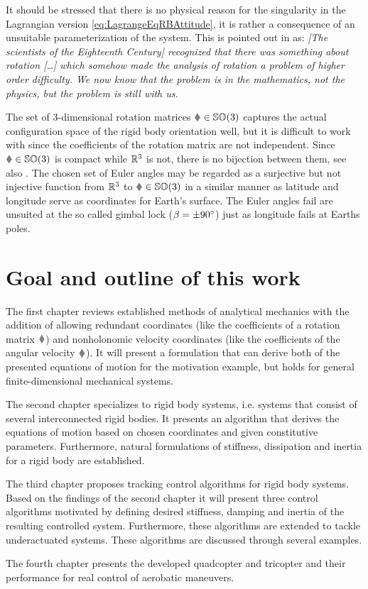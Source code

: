 It should be stressed that there is no physical reason for the singularity in the Lagrangian version \eqref{eq:LagrangeEqRBAttitude}, it is rather a consequence of an unsuitable parameterization of the system.
This is pointed out in \cite[sec.\ 1.1.1]{Schwertassek:MultibodySystems} as:
\textit{
[The scientists of the Eighteenth Century] recognized that there was something about rotation [\ldots] which somehow made the analysis of rotation a problem of higher order difficulty. 
We now know that the problem is in the mathematics, not the physics, but the problem is still with us.
}

The set of 3-dimensional rotation matrices $\R\in\SpecialOrthogonalGroup(3)$ captures the actual configuration space of the rigid body orientation well, but it is difficult to work with since the coefficients of the rotation matrix are not independent.
Since $\R\in\SpecialOrthogonalGroup(3)$ is compact while $\mathbb{R}^3$ is not, there is no bijection between them, see also \cite[sec.\ 1.1d]{Frankel:GeometryOfPhysics}.
The chosen set of Euler angles may be regarded as a surjective but not injective function from $\mathbb{R}^3$ to $\R\in\SpecialOrthogonalGroup(3)$ in a similar manner as latitude and longitude serve as coordinates for Earth's surface. 
The Euler angles fail are unsuited at the so called gimbal lock ($\beta=\pm 90^\circ$) just as longitude fails at Earths poles.


\section{Goal and outline of this work}
The first chapter reviews established methods of analytical mechanics with the addition of allowing redundant coordinates (like the coefficients of a rotation matrix $\R$) and nonholonomic velocity coordinates (like the coefficients of the angular velocity $\w$).
It will present a formulation that can derive both of the presented equations of motion for the motivation example, but holds for general finite-dimensional mechanical systems.

The second chapter specializes to rigid body systems, i.e. systems that consist of several interconnected rigid bodies.
It presents an algorithm that derives the equations of motion based on chosen coordinates and given constitutive parameters.
Furthermore, natural formulations of stiffness, dissipation and inertia for a rigid body are established.

The third chapter proposes tracking control algorithms for rigid body systems.
Based on the findings of the second chapter it will present three control algorithms motivated by defining desired stiffness, damping and inertia of the resulting controlled system.
Furthermore, these algorithms are extended to tackle underactuated systems.
These algorithms are discussed through several examples.

The fourth chapter presents the developed quadcopter and tricopter and their performance for real control of aerobatic maneuvers.

